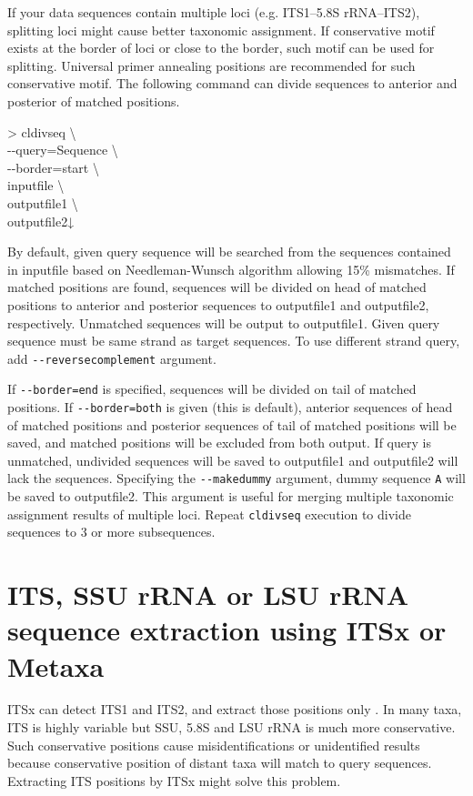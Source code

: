 \documentclass[titlepage,10pt,a4paper,english]{jsbook}
\newenvironment{cmd}{\begin{oframed}\raggedright\ttfamily\footnotesize\setlength{\baselineskip}{1.4em}}{\end{oframed}\vspace{-1em}}
\begin{document}
If your data sequences contain multiple loci (e.g. ITS1--5.8S rRNA--ITS2), splitting loci might cause better taxonomic assignment.
If conservative motif exists at the border of loci or close to the border, such motif can be used for splitting.
Universal primer annealing positions are recommended for such conservative motif.
The following command can divide sequences to anterior and posterior of matched positions.
\begin{cmd}
{\textgreater} cldivseq {\textbackslash}\\
{-}{-}query=Sequence {\textbackslash}\\
{-}{-}border=start {\textbackslash}\\
inputfile {\textbackslash}\\
outputfile1 {\textbackslash}\\
outputfile2↓
\end{cmd}
By default, given query sequence will be searched from the sequences contained in inputfile based on Needleman-Wunsch algorithm allowing 15\% mismatches.
If matched positions are found, sequences will be divided on head of matched positions to anterior and posterior sequences to outputfile1 and outputfile2, respectively.
Unmatched sequences will be output to outputfile1.
Given query sequence must be same strand as target sequences.
To use different strand query, add \texttt{{-}{-}reversecomplement} argument.

If \texttt{{-}{-}border=end} is specified, sequences will be divided on tail of matched positions.
If \texttt{{-}{-}border=both} is given (this is default), anterior sequences of head of matched positions and posterior sequences of tail of matched positions will be saved, and matched positions will be excluded from both output.
If query is unmatched, undivided sequences will be saved to outputfile1 and outputfile2 will lack the sequences.
Specifying the \texttt{{-}{-}makedummy} argument, dummy sequence \texttt{A} will be saved to outputfile2.
This argument is useful for merging multiple taxonomic assignment results of multiple loci.
Repeat \texttt{cldivseq} execution to divide sequences to 3 or more subsequences.

\section{ITS, SSU rRNA or LSU rRNA sequence extraction using ITSx or Metaxa}

ITSx can detect ITS1 and ITS2, and extract those positions only \citep{Bengtsson2013}.
In many taxa, ITS is highly variable but SSU, 5.8S and LSU rRNA is much more conservative.
Such conservative positions cause misidentifications or unidentified results because conservative position of distant taxa will match to query sequences.
Extracting ITS positions by ITSx might solve this problem.
\end{document}
